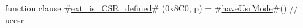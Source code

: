 function clause #\hyperref[sailRISCVzextzyiszyCSRzydefined]{ext\_is\_CSR\_defined}# (0x8C0, p) = #\hyperref[sailRISCVzhaveUsrMode]{haveUsrMode}#()  // uccsr
